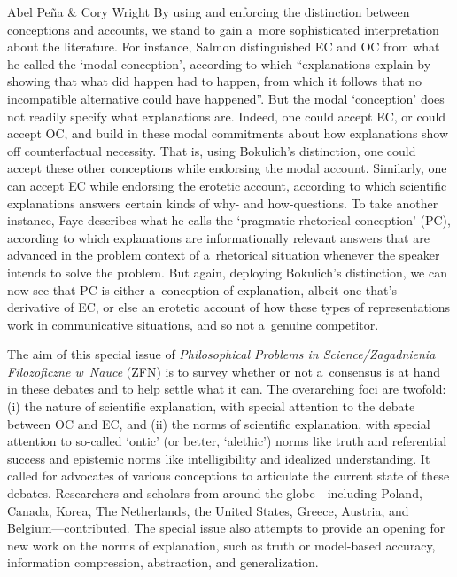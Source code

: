\begin{editorialeng}{Abel Peña \& Cory Wright}
By using and enforcing the distinction between conceptions and accounts, we stand to gain a~more sophisticated interpretation about the literature. For instance, Salmon
\parencite*[][p.301]{salmon_scientific_1984} %
 distinguished EC and OC from what he called the `modal conception', according to which ``explanations explain by showing that what did happen had to happen, from which it follows that no incompatible alternative could have happened''. But the modal `conception' does not readily specify what explanations are. Indeed, one could accept EC, or could accept OC, and build in these modal commitments about how explanations show off counterfactual necessity. That is, using Bokulich's distinction, one could accept these other conceptions while endorsing the modal account. Similarly, one can accept EC while endorsing the erotetic account, according to which scientific explanations answers certain kinds of why- and how-questions. To take another instance, Faye 
\parencites*[][]{faye_explanation_1999}[][]{faye_pragmatic-rhetorical_2007} %
 describes what he calls the `pragmatic-rhetorical conception' (PC), according to which explanations are informationally relevant answers that are advanced in the problem context of a~rhetorical situation whenever the speaker intends to solve the problem. But again, deploying Bokulich's distinction, we can now see that PC is either a~conception of explanation, albeit one that's derivative of EC, or else an erotetic account of how these types of representations work in communicative situations, and so not a~genuine competitor.

The aim of this special issue of \textit{Philosophical Problems in Science/Zagadnienia Filozoficzne w~Nauce} (ZFN) is to survey whether or not a~consensus is at hand in these debates and to help settle what it can. The overarching foci are twofold: (i) the nature of scientific explanation, with special attention to the debate between OC and EC, and (ii) the norms of scientific explanation, with special attention to so-called `ontic' (or better, `alethic') norms like truth and referential success and epistemic norms like intelligibility and idealized understanding. It called for advocates of various conceptions to articulate the current state of these debates. Researchers and scholars from around the globe---including Poland, Canada, Korea, The Netherlands, the United States, Greece, Austria, and Belgium---contributed. The special issue also attempts to provide an opening for new work on the norms of explanation, such as truth or model-based accuracy, information compression, abstraction, and generalization.


\end{editorialeng}
